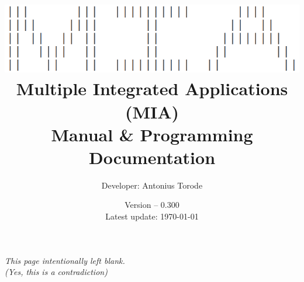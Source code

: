 \documentclass[openany,a4paper,10pt]{book}
\title{\vspace{0.1cm}  \includegraphics[scale=0.5]{./images/MIA_cropped_Inverted.png} \vspace{.5cm} \\ Multiple Integrated Applications (MIA) \\  Manual \& Programming Documentation}
\author{Developer: Antonius Torode}
\date{Version -- 0.300 \\ Latest update: \today}
\begin{document}
\frontmatter
\maketitle

\tableofcontents
\newpage
\vspace*{\fill}
\begin{center}
	\textit{This page intentionally left blank. \\(Yes, this is a contradiction)}
\end{center}
\vspace*{\fill}

\mainmatter
\pagestyle{fancy}
\fancyhf{}
\fancyhead[RO, LE]{\thepage}



%








\backmatter
%
%
\printindex
\end{document}
